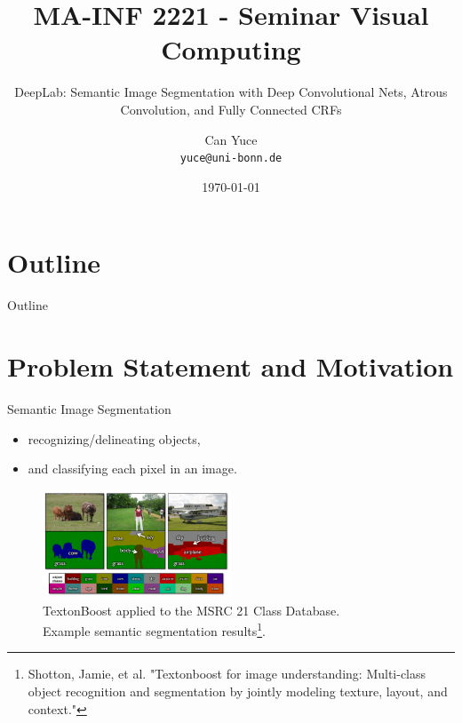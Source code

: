 \documentclass{beamer}
\title[Seminar Visual Computing] {MA-INF 2221 - Seminar Visual Computing}
\subtitle {DeepLab: Semantic Image Segmentation with Deep Convolutional Nets, Atrous Convolution, and Fully Connected CRFs }
\author[Can Yuce]{Can Yuce\inst{1} \\
\texttt{yuce@uni-bonn.de}}
\institute[University of Bonn] 
{
	\inst{1}
	Department of Informatics\\
	University of Bonn
}
\date{\today}
\begin{document}
\begin{frame}
	\titlepage
\end{frame}

\section{Outline}

\begin{frame}{Outline}
  \tableofcontents
\end{frame}

\section{Problem Statement and Motivation}

\begin{frame}{Semantic Image Segmentation}
\begin{itemize}
	\item recognizing/delineating objects,
	\item and classifying each pixel in an image.
\end{itemize}
\begin{figure}
	\centering
	\includegraphics[width=0.5\textwidth]{figure/ss2.png}
	\captionsetup{justification=centering}
	\caption{TextonBoost applied to the MSRC 21 Class Database.\\Example semantic segmentation results\footnote{Shotton, Jamie, et al. "Textonboost for image understanding: Multi-class \\object recognition and segmentation by jointly modeling texture, layout, and context."}.\label{label1}}
\end{figure}
\end{frame}
\end{document}
